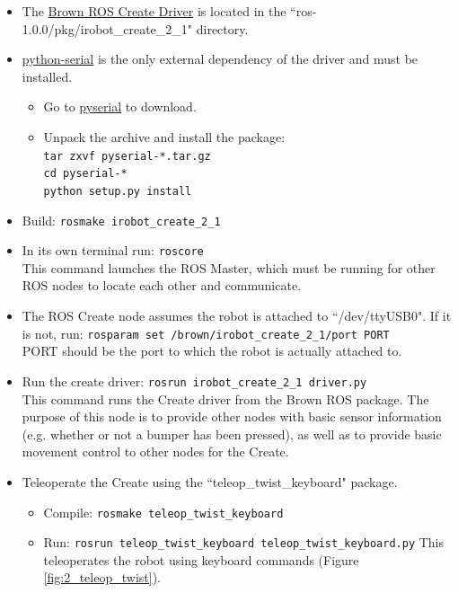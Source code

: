 \begin{itemize}

\item The \href{http://code.google.com/p/brown-ros-pkg/wiki/irobot\_create\_2\_1}{Brown ROS Create Driver} is located in the ``ros-1.0.0/pkg/irobot\_create\_2\_1" directory. 


 

\item \href{http://pyserial.sourceforge.net/}{python-serial} is the only external dependency of the driver and must be installed.
\begin{itemize}
\item Go to \href{http://sourceforge.net/projects/pyserial/files/}{pyserial} to download.
\item Unpack the archive and install the package: \\
\texttt{tar zxvf pyserial-*.tar.gz}\\
\texttt{cd pyserial-*}\\
\texttt{python setup.py install}
\end{itemize}

\item Build: \texttt{rosmake irobot\_create\_2\_1}

\item In its own terminal run: \texttt{roscore}\\
This command launches the ROS Master, which must be running for other ROS nodes to locate each other and communicate.

\item The ROS Create node assumes the robot is attached to ``/dev/ttyUSB0". If it is not, run: \texttt{rosparam set /brown/irobot\_create\_2\_1/port PORT}\\
PORT should be the port to which the robot is actually attached to.

\item Run the create driver: \texttt{rosrun irobot\_create\_2\_1 driver.py}\\
This command runs the Create driver from the Brown ROS package. The purpose of this node is to provide other nodes with basic sensor information (e.g. whether or not a bumper has been pressed), as well as to provide basic movement control to other nodes for the Create.

\item Teleoperate the Create using the ``teleop\_twist\_keyboard" package.
\begin{itemize}
\item Compile: \texttt{rosmake teleop\_twist\_keyboard}
\item Run: \texttt{rosrun teleop\_twist\_keyboard teleop\_twist\_keyboard.py}
This teleoperates the robot using keyboard commands (Figure \ref{fig:2_teleop_twist}).
\end{itemize}


\end{itemize}
